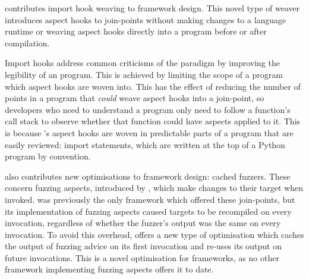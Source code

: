 \pdsfthree contributes import hook weaving to \aop{} framework design. This
novel type of weaver introduces aspect hooks to join-points without making
changes to a language runtime or weaving aspect hooks directly into a program
before or after compilation. 

Import hooks address common criticisms of the \aspectoriented{} paradigm by
improving the legibility of an \aop{} program. This is achieved by limiting the
scope of a program which aspect hooks are woven into. This has the effect of
reducing the number of points in a program that \emph{could} weave aspect hooks
into a join-point, so developers who need to understand a program only need to
follow a function's call stack to observe whether that function could have
aspects applied to it. This is because \pdsfthree{}'s aspect hooks are woven in
predictable parts of a program that are easily reviewed: import statements,
which are written at the top of a Python program by convention.




\pdsfthree also contributes new optimisations to \aop{} framework design: cached
fuzzers. These concern fuzzing aspects, introduced by \pydysofu, which make
changes to their target when invoked. \pydysofu was previously the only \aop{}
framework which offered these join-points, but its implementation of fuzzing
aspects caused targets to be recompiled on every invocation, regardless of
whether the fuzzer's output was the same on every invocation. To avoid this
overhead, \pdsfthree offers a new type of optimisation which caches the output
of fuzzing advice on its first invocation and re-uses its output on future
invocations. This is a novel optimisation for \aop{} frameworks, as no other
framework implementing fuzzing aspects offers it to date.

